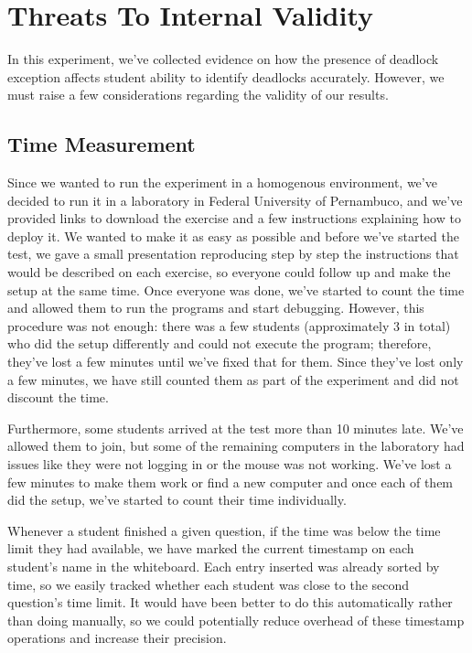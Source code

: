 \section{Threats To Internal Validity}

In this experiment, we've collected evidence on how the presence of deadlock exception affects student ability to identify deadlocks accurately. However, we must raise a few considerations regarding the validity of our results.

\subsection{Time Measurement}

Since we wanted to run the experiment in a homogenous environment, we've decided to run it in a laboratory in Federal University of Pernambuco, and we've provided links to download the exercise and a few instructions explaining how to deploy it. We wanted to make it as easy as possible and before we've started the test, we gave a small presentation reproducing step by step the instructions that would be described on each exercise, so everyone could follow up and make the setup at the same time. Once everyone was done, we've started to count the time and allowed them to run the programs and start debugging. However, this procedure was not enough: there was a few students (approximately 3 in total) who did the setup differently and could not execute the program; therefore, they've lost a few minutes until we've fixed that for them. Since they've lost only a few minutes, we have still counted them as part of the experiment and did not discount the time.

Furthermore, some students arrived at the test more than 10 minutes late. We've allowed them to join, but some of the remaining computers in the laboratory had issues like they were not logging in or the mouse was not working. We've lost a few minutes to make them work or find a new computer and once each of them did the setup, we've started to count their time individually.

Whenever a student finished a given question, if the time was below the time limit they had available, we have marked the current timestamp on each student's name in the whiteboard. Each entry inserted was already sorted by time, so we easily tracked whether each student was close to the second question's time limit. It would have been better to do this automatically rather than doing manually, so we could potentially reduce overhead of these timestamp operations and increase their precision.

